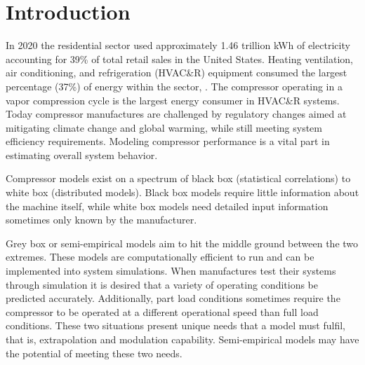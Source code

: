 \documentclass[preprint,11pt,authoryear]{elsarticle}
\begin{document}
\section{Introduction}

In 2020 the residential sector used approximately 1.46 trillion kWh of electricity accounting for 39\% of total retail sales in the United States. Heating ventilation, air conditioning, and refrigeration (HVAC\&R) equipment consumed the largest percentage (37\%) of energy within the sector, \cite{EIA}. The compressor operating in a vapor compression cycle is the largest energy consumer in HVAC\&R systems. Today compressor manufactures are challenged by regulatory changes aimed at mitigating climate change and global warming, while still meeting system efficiency requirements. Modeling compressor performance is a vital part in estimating overall system behavior.

Compressor models exist on a spectrum of black box (statistical correlations) to white box (distributed models). Black box models require little information about the machine itself, while white box models need detailed input information sometimes only known by the manufacturer.
\begin{framed}
\printnomenclature
\end{framed}
Grey box or semi-empirical models aim to hit the middle ground between the two extremes. These models are computationally efficient to run and can be implemented into system simulations. When manufactures test their systems through simulation it is desired that a variety of operating conditions be predicted accurately. Additionally, part load conditions sometimes require the compressor to be operated at a different operational speed than full load conditions. These two situations present unique needs that a model must fulfil, that is, extrapolation and modulation capability. Semi-empirical models may have the potential of meeting these two needs.
\end{document}
